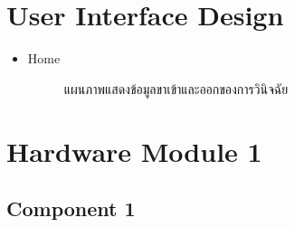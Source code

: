 \documentclass[12pt,oneside,openright,a4paper]{cpe-thai-project}
\begin{document}
 












\section{User Interface Design}
\begin{itemize}
  \item Home
  \begin{figure}[!ht]\centering
    \setlength{\fboxrule}{0.2mm} %
    \setlength{\fboxsep}{1cm}
    \caption{แผนภาพแสดงข้อมูลขาเข้าและออกของการวินิจฉัย}\label{fig:system}
   \end{figure}
\end{itemize}



\section{Hardware Module 1}
\subsection{Component 1}
\end{document}

